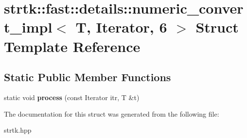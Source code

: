 \hypertarget{structstrtk_1_1fast_1_1details_1_1numeric__convert__impl_3_01T_00_01Iterator_00_016_01_4}{\section{strtk\-:\-:fast\-:\-:details\-:\-:numeric\-\_\-convert\-\_\-impl$<$ T, Iterator, 6 $>$ Struct Template Reference}
\label{structstrtk_1_1fast_1_1details_1_1numeric__convert__impl_3_01T_00_01Iterator_00_016_01_4}
}
\subsection*{Static Public Member Functions}
\begin{DoxyCompactItemize}
\item 
\hypertarget{structstrtk_1_1fast_1_1details_1_1numeric__convert__impl_3_01T_00_01Iterator_00_016_01_4_a018c2e681e6b5edb48ef93c5cd98d639}{static void {\bfseries process} (const Iterator itr, T \&t)}\label{structstrtk_1_1fast_1_1details_1_1numeric__convert__impl_3_01T_00_01Iterator_00_016_01_4_a018c2e681e6b5edb48ef93c5cd98d639}

\end{DoxyCompactItemize}


The documentation for this struct was generated from the following file\-:\begin{DoxyCompactItemize}
\item 
strtk.\-hpp\end{DoxyCompactItemize}
